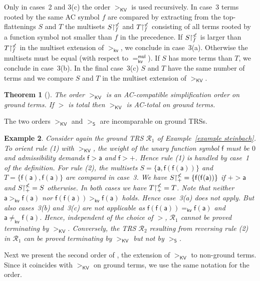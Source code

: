 \documentclass{tlp}
\newtheorem{theorem}{Theorem}[section]
\newtheorem{example}[theorem]{Example}
\newcommand{\m}[1]{\mathsf{#1}}
\newcommand{\mc}[1]{\mathcal{#1}}
\newcommand{\mr}[1]{\mathrm{#1}}
\newcommand{\Wt}{\m{w,root}}
\renewcommand{\Wt}{\m{kv}}
\newcommand{\mul}{\m{mul}}
\newcommand{\steinbach}{\mr{\m{S}}}
\newcommand{\KV}{\mr{\m{KV}}}
\newcommand{\rrs}[3][f]{{#2}{\restriction}^{\smash{#3}}_{#1}}
\newcommand{\RR}{\mc{R}}
\begin{document}
Only in cases~2 and 3(c)
the order $>_\KV$ is used recursively.
In case~3 terms rooted by the same AC symbol $f$ are compared by
extracting from the top\hyp flattenings $S$ and $T$ the multisets
$\rrs{S}{\nless}$ and $\rrs{T}{\nless}$
consisting of all terms rooted by a function symbol not
smaller than $f$ in the precedence.
If $\rrs{S}{\nless}$ is larger than
$\rrs{T}{\nless}$ in the multiset extension of $>_\Wt$,
we conclude in case~3(a). Otherwise the multisets must be equal
(with respect to $=_\Wt^\mul$).
If $S$ has more terms than $T$, we conclude in case~3(b). In the
final case~3(c) $S$ and $T$ have the same number of terms and we
compare $S$ and $T$ in the multiset extension of $>_\KV$.

\begin{theorem}[]
\label{thm:KV ground}
The order $>_\KV$ is an AC-compatible simplification order on ground
terms. If $>$ is total then $>_\KV$ is AC-total on ground terms.
\end{theorem}

The two orders $>_\KV$ and $>_\steinbach$ are incomparable on ground TRSs.

\begin{example}
\label{KV does not subsume S}
Consider again the ground TRS $\RR_1$ of Example~\ref{example steinbach}.
To orient rule (1) with $>_\KV$, the weight of the unary function
symbol $\m{f}$ must be $0$ and admissibility demands $\m{f} > \m{a}$
and $\m{f} > +$. Hence rule (1) is handled by case~1 of the
definition. For rule (2), the multisets
$S = \{ \m{a}, \m{f}(\m{f}(\m{a})) \}$ and
$T = \{ \m{f}(\m{a}), \m{f}(\m{a}) \}$ are compared in case~3. We have
$\rrs[+]{S}{\nless} = \{ \m{f}(\m{f}(\m{a})) \}$ if $+ > \m{a}$
and $\rrs[+]{S}{\nless} = S$ otherwise.
In both cases we have $\rrs[+]{T}{\nless} = T$.
Note that neither
$\m{a} >_\Wt \m{f}(\m{a})$ nor
$\m{f}(\m{f}(\m{a})) >_\Wt \m{f}(\m{a})$ holds. Hence case~3(a)
does not apply. But also cases~3(b) and~3(c) are not applicable as
$\m{f}(\m{f}(\m{a})) =_\Wt \m{f}(\m{a})$ and
$\m{a} \neq_\Wt \m{f}(\m{a})$. Hence, independent of the choice of
$>$, $\RR_1$ cannot be proved terminating by $>_\KV$.
Conversely, the TRS $\RR_2$ resulting from reversing rule (2)
in $\RR_1$ can be proved terminating by $>_\KV$ but not by
$>_\steinbach$.
\end{example}



Next we present the second order of , the extension of
$>_\KV$ to non-ground terms. Since it coincides with $>_\KV$
on ground terms, we use the same notation for the order.
\end{document}
